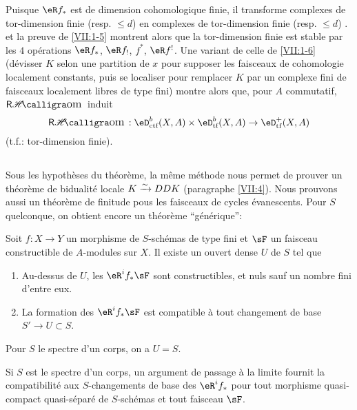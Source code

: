 Puisque $\eR f_\ast$ est de dimension cohomologique finie, il transforme 
complexes de tor-dimension finie (resp. $\leqslant d$) en complexes de 
tor-dimension finie (resp. $\leqslant d$) \cite[XVII 5.2.11]{sga4}. 
\cite[XVII 5.2.10]{sga4} et la preuve de \ref{VII:1-5} montrent alors que la 
tor-dimension finie est stable par les $4$ opérations $\eR f_\ast$, 
$\eR f_!$, $f^\ast$, $\eR f^!$. Une variant de celle de \ref{VII:1-6} 
(dévisser $K$ selon une partition de $x$ pour supposer les faisceaux de 
cohomologie localement constants, puis se localiser pour remplacer $K$ par un 
complexe fini de faisceaux localement libres de type fini) montre alors que, 
pour $A$ commutatif, $\rHom$ induit 
\[
  \rHom:\eD_\text{ctf}^b(X,A)\times \eD_\text{tf}^b(X,A) \to \eD_\text{tf}^+(X,A) 
\]
(t.f.: tor-dimension finie). 





\subsection{}\label{VII:1-8}

Sous les hypothèses du théorème, la même méthode nous permet de 
prouver un théorème de bidualité locale $K\xrightarrow\sim D D K$ (paragraphe 
\ref{VII:4}). Nous prouvons aussi un théorème de finitude pous les 
faisceaux de cycles évanescents. Pour $S$ quelconque, on obtient encore un 
théorème ``générique'': 





\begin{theorem_}\label{VII:1-9}
Soit $f:X\to Y$ un morphisme de $S$-schémas de type fini et $\sF$ un faisceau 
constructible de $A$-modules sur $X$. Il existe un ouvert dense $U$ de $S$ tel 
que 
\begin{enumerate}[\indent (i)]
  \item Au-dessus de $U$, les $\eR^i f_\ast \sF$ sont constructibles, et nuls 
    sauf un nombre fini d'entre eux. 
  \item La formation des $\eR^i f_\ast \sF$ est compatible à tout 
    changement de base $S' \to U\subset S$. 
\end{enumerate}
\end{theorem_}

Pour $S$ le spectre d'un corps, on a $U=S$. 

Si $S$ est le spectre d'un corps, un argument de passage à la limite fournit 
la compatibilité aux $S$-changements de base des $\eR^i f_\ast$ pour tout 
morphisme quasi-compact quasi-séparé de $S$-schémas et tout faisceau 
$\sF$. 






